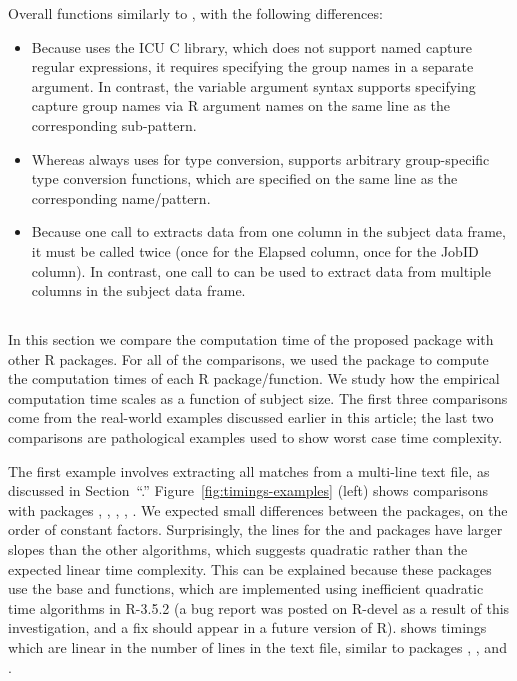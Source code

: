Overall  functions
similarly to
, with the following
differences:
\begin{itemize}
\item Because  uses the ICU C library, which does
  not support named capture regular expressions, it requires
  specifying the group names in a separate argument. In contrast, the
   variable argument syntax supports specifying
  capture group names via R argument names on the same line as the
  corresponding sub-pattern.
\item Whereas  always uses
   for type conversion,
   supports arbitrary
  group-specific type conversion functions, which are specified on the
  same line as the corresponding name/pattern.
\item Because one call to  extracts data from one
  column in the subject data frame, it must be called twice (once for
  the Elapsed column, once for the JobID column). In contrast, one
  call to  can be used to
  extract data from multiple columns in the subject data frame. 
\end{itemize}

\subsection{\sectiontimings}
\label{sec:timings}

In this section we compare the computation time of the proposed
 package with other R packages. For all of the
comparisons, we used the  package to compute
the computation times of each R package/function. We study how the
empirical computation time scales as a function of subject size. The
first three comparisons come from the real-world examples discussed
earlier in this article; the last two comparisons are pathological examples
used to show worst case time complexity.

The first example involves extracting all matches from a multi-line
text file, as discussed in Section~``\sectiontrackDb.''
Figure~\ref{fig:timings-examples} (left) shows comparisons with
packages , , ,
, . We expected small differences
between the packages, on the order of constant factors. Surprisingly,
the lines for the  and  packages have
larger slopes than the other algorithms, which suggests quadratic
rather than the expected linear time complexity. This can be explained
because these packages use the base  and
 functions, which are implemented using inefficient
quadratic time algorithms in R-3.5.2 (a bug report was posted on
R-devel as a result of this investigation, and a fix should appear in
a future version of R).  shows timings which are
linear in the number of lines in the text file, similar to packages
, , and .



